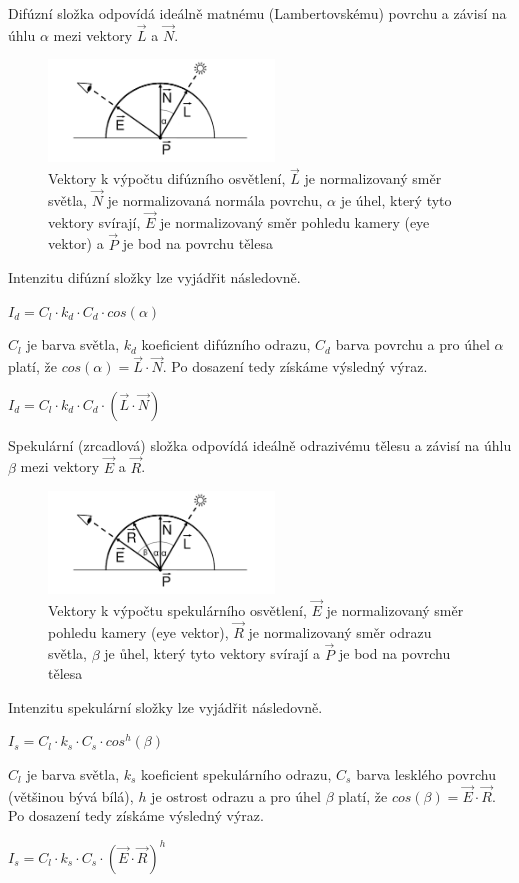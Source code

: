 \documentclass[11pt,twoside,a4paper]{book}
\begin{document}
Difúzní složka odpovídá ideálně matnému (Lambertovskému) povrchu a závisí na úhlu $\alpha$ mezi vektory $\vec{L}$ a $\vec{N}$.
\begin{center}
\begin{figure}[h!]
\includegraphics[width=60mm]{figures/phongD.png}
\caption{Vektory k výpočtu difúzního osvětlení, $\vec{L}$ je normalizovaný směr světla, $\vec{N}$ je normalizovaná normála povrchu, $\alpha$ je úhel, který tyto vektory svírají, $\vec{E}$ je normalizovaný směr pohledu kamery (eye vektor) a $\vec{P}$ je bod na povrchu tělesa}
\end{figure}
\end{center}
Intenzitu difúzní složky lze vyjádřit následovně.
\begin{center}
$I_d = C_l \cdot k_d \cdot C_d \cdot cos(\alpha)$
\end{center}
$C_l$ je barva světla, $k_d$ koeficient difúzního odrazu, $C_d$ barva povrchu a pro úhel $\alpha$ platí, že $cos(\alpha) = \vec{L} \cdot \vec{N}$. Po dosazení tedy získáme výsledný výraz.
\begin{center}
$I_d = C_l \cdot k_d \cdot C_d \cdot (\vec{L} \cdot \vec{N})$
\end{center}
\bigskip

Spekulární (zrcadlová) složka odpovídá ideálně odrazivému tělesu a závisí na úhlu $\beta$ mezi vektory $\vec{E}$ a $\vec{R}$. 
\begin{center}
\begin{figure}[h!]
\includegraphics[width=60mm]{figures/phongS.png}
\caption{Vektory k výpočtu spekulárního osvětlení, $\vec{E}$ je normalizovaný směr pohledu kamery (eye vektor), $\vec{R}$ je normalizovaný směr odrazu světla, $\beta$ je ůhel, který tyto vektory svírají a $\vec{P}$ je bod na povrchu tělesa}
\end{figure}
\end{center}
Intenzitu spekulární složky lze vyjádřit následovně.
\begin{center}
$I_s = C_l \cdot k_s \cdot C_s \cdot cos^h(\beta)$
\end{center}
$C_l$ je barva světla, $k_s$ koeficient spekulárního odrazu, $C_s$ barva lesklého povrchu (většinou bývá bílá), $h$ je ostrost odrazu a pro úhel $\beta$ platí, že $cos(\beta) = \vec{E} \cdot \vec{R}$. Po dosazení tedy získáme výsledný výraz.
\begin{center}
$I_s = C_l \cdot k_s \cdot C_s \cdot (\vec{E} \cdot \vec{R})^h$
\end{center}
\end{document}
